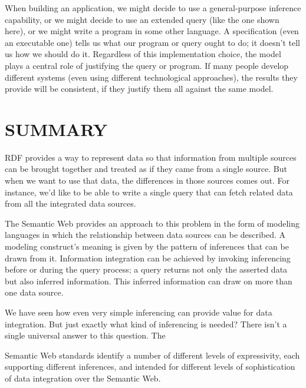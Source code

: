 When building an application, we might decide to use a general-purpose
inference capability, or we might decide to use an extended query (like
the one shown here), or we might write a program in some other language.
A specification (even an executable one) tells us what our program or
query ought to do; it doesn't tell us how we should do it. Regardless of
this implementation choice, the model plays a central role of justifying
the query or program. If many people develop different systems (even
using different technological approaches), the results they provide will
be consistent, if they justify them all against the same model.

\section{SUMMARY}

RDF provides a way to represent data so that information from multiple
sources can be brought together and treated as if they came from a
single source. But when we want to use that data, the differences in
those sources comes out. For instance, we'd like to be able to write a
single query that can fetch related data from all the integrated data
sources.

The Semantic Web provides an approach to this problem in the form of
modeling languages in which the relationship between data sources can be
described. A modeling construct's meaning is given by the pattern of
inferences that can be drawn from it. Information integration can be
achieved by invoking inferencing before or during the query process; a
query returns not only the asserted data but also inferred information.
This inferred information can draw on more than one data source.

We have seen how even very simple inferencing can provide value for data
integration. But just exactly what kind of inferencing is needed? There
isn't a single universal answer to this question. The

Semantic Web standards identify a number of different levels of
expressivity, each supporting different inferences, and intended for
different levels of sophistication of data integration over the Semantic
Web.

